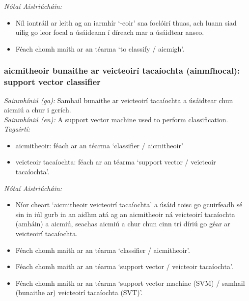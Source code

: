  \noindent \textit{Nótaí Aistriúcháin:}
\begin{itemize}
	\item Níl iontráil ar leith ag an iarmhír `-eoir' sna foclóirí thuas, ach luann siad uilig go leor focal a úsáideann í díreach mar a úsáidtear anseo.
	\item Féach chomh maith ar an téarma `to classify / aicmigh'.
\end{itemize}


\subsubsection*{aicmitheoir bunaithe ar veicteoirí tacaíochta (ainmfhocal): support vector classifier}
 \noindent \textit{Sainmhíniú (ga):} Samhail bunaithe ar veicteoirí tacaíochta a úsáidtear chun aicmiú a chur i gcrích.
\\
 \noindent \textit{Sainmhíniú (en):} A support vector machine used to perform classification.
\\
 \noindent \textit{Tagairtí:}
\begin{itemize}
	\item aicmitheoir: féach ar an téarma `classifier / aicmitheoir'
	\item veicteoir tacaíochta: féach ar an téarma `support vector / veicteoir tacaíochta'.
\end{itemize}

 \noindent \textit{Nótaí Aistriúcháin:}
\begin{itemize}
	\item Níor cheart `aicmitheoir veicteoirí tacaíochta' a úsáid toisc go gcuirfeadh sé sin in iúl gurb in an aidhm atá ag an aicmitheoir ná veicteoirí tacaíochta (amháin) a aicmiú, seachas aicmiú a chur chun cinn trí díriú go géar ar veicteoirí tacaíochta.
	\item Féach chomh maith ar an téarma `classifier / aicmitheoir'.
	\item Féach chomh maith ar an téarma `support vector / veicteoir tacaíochta'.
	\item Féach chomh maith ar an téarma `support vector machine (SVM) / samhail (bunaithe ar) veicteoirí tacaíochta (SVT)'.
\end{itemize}


